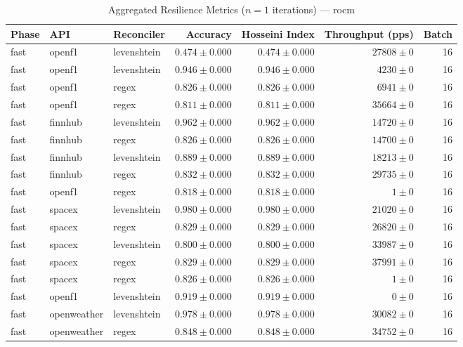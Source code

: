 
\begin{table}[htbp]
\caption{Aggregated Resilience Metrics ($n=1$ iterations) --- rocm}
\begin{tabular}{l l l r r r r}
\hline
Phase & API & Reconciler & Accuracy & Hosseini Index & Throughput (pps) & Batch \\
\hline
fast & openf1 & levenshtein & $0.474\pm0.000$ & $0.474\pm0.000$ & $27808\pm0$ & 16 \\
fast & openf1 & levenshtein & $0.946\pm0.000$ & $0.946\pm0.000$ & $4230\pm0$ & 16 \\
fast & openf1 & regex & $0.826\pm0.000$ & $0.826\pm0.000$ & $6941\pm0$ & 16 \\
fast & openf1 & regex & $0.811\pm0.000$ & $0.811\pm0.000$ & $35664\pm0$ & 16 \\
fast & finnhub & levenshtein & $0.962\pm0.000$ & $0.962\pm0.000$ & $14720\pm0$ & 16 \\
fast & finnhub & regex & $0.826\pm0.000$ & $0.826\pm0.000$ & $14700\pm0$ & 16 \\
fast & finnhub & levenshtein & $0.889\pm0.000$ & $0.889\pm0.000$ & $18213\pm0$ & 16 \\
fast & finnhub & regex & $0.832\pm0.000$ & $0.832\pm0.000$ & $29735\pm0$ & 16 \\
fast & openf1 & regex & $0.818\pm0.000$ & $0.818\pm0.000$ & $1\pm0$ & 16 \\
fast & spacex & levenshtein & $0.980\pm0.000$ & $0.980\pm0.000$ & $21020\pm0$ & 16 \\
fast & spacex & regex & $0.829\pm0.000$ & $0.829\pm0.000$ & $26820\pm0$ & 16 \\
fast & spacex & levenshtein & $0.800\pm0.000$ & $0.800\pm0.000$ & $33987\pm0$ & 16 \\
fast & spacex & regex & $0.829\pm0.000$ & $0.829\pm0.000$ & $37991\pm0$ & 16 \\
fast & spacex & regex & $0.826\pm0.000$ & $0.826\pm0.000$ & $1\pm0$ & 16 \\
fast & openf1 & levenshtein & $0.919\pm0.000$ & $0.919\pm0.000$ & $0\pm0$ & 16 \\
fast & openweather & levenshtein & $0.978\pm0.000$ & $0.978\pm0.000$ & $30082\pm0$ & 16 \\
fast & openweather & regex & $0.848\pm0.000$ & $0.848\pm0.000$ & $34752\pm0$ & 16 \\

\end{tabular}
\end{table}
